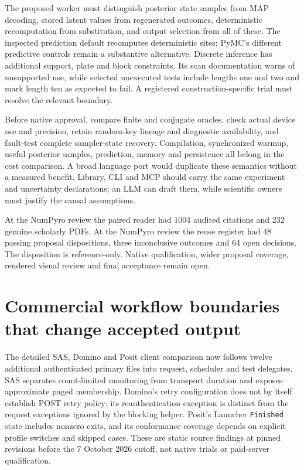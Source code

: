 The proposed worker must distinguish posterior state samples from MAP
decoding, stored latent values from regenerated outcomes, deterministic
recomputation from substitution, and output selection from all of these.
The inspected prediction default recomputes deterministic sites; PyMC's
different predictive controls remain a substantive alternative. Discrete
inference has additional support, plate and block constraints. Its scan
documentation warns of unsupported use, while selected unexecuted tests
include lengths one and two and mark length ten as expected to fail. A
registered construction-specific trial must resolve the relevant
boundary. \citep{exec23_numpyro_sources,exec23_pymc_sources}

Before native approval, compare finite and conjugate oracles, check
actual device use and precision, retain random-key lineage and
diagnostic availability, and fault-test complete sampler-state recovery.
Compilation, synchronized warmup, useful posterior samples, prediction,
memory and persistence all belong in the cost comparison. A broad
language port would duplicate these semantics without a measured
benefit. Library, CLI and MCP should carry the same experiment and
uncertainty declarations; an LLM can draft them, while scientific owners
must justify the causal assumptions.
\citep{exec23_numpyro_sources,exec23_numpyro_reference}

At the NumPyro review the paired reader had 1004 audited citations and
232 genuine scholarly PDFs. At the NumPyro review the reuse register had
48 passing proposal dispositions, three inconclusive outcomes and 64
open decisions. The disposition is reference-only. Native qualification,
wider proposal coverage, rendered visual review and final acceptance
remain open. \citep{sp23numpyro_reader,sp23numpyro_progress}

\hypertarget{commercial-workflow-boundaries-that-change-accepted-output}{%
\section{Commercial workflow boundaries that change accepted
output}\label{commercial-workflow-boundaries-that-change-accepted-output}}

The detailed SAS, Domino and Posit client comparison now follows twelve
additional authenticated primary files into request, scheduler and test
delegates. SAS separates count-limited monitoring from transport
duration and exposes approximate paged membership. Domino's retry
configuration does not by itself establish POST retry policy; its
reauthentication exception is distinct from the request exceptions
ignored by the blocking helper. Posit's Launcher \texttt{Finished} state
includes nonzero exits, and its conformance coverage depends on explicit
profile switches and skipped cases. These are static source findings at
pinned revisions before the 7 October 2026 cutoff, not native trials or
paid-server qualification.
\citep{exec23_workflow_delegates_sasctl,exec23_workflow_delegates_dominopy,exec23_workflow_delegates_positgo}

